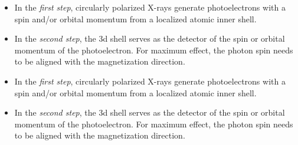 \documentclass[11pt, parskip=full, DIV=14]{scrreprt}
\begin{document}
\begin{tcolorbox}[
colframe=blue!25,
colback=blue!10,
coltitle=blue!20!black,  
fonttitle=\bfseries,
width=0.48\textwidth,
adjusted title=Opportunities]
\begin{itemize}
\item In the \textit{first step}, circularly polarized X-rays generate photoelectrons with a spin and/or orbital momentum from a localized atomic inner shell.
\item In the \textit{second step}, the 3d shell serves as the detector of the spin or orbital momentum of the photoelectron. For maximum effect, the photon spin needs to be aligned with the magnetization direction.
\end{itemize}
\end{tcolorbox}
\begin{tcolorbox}[
colframe=blue!25,
colback=blue!10,
coltitle=blue!20!black,  
fonttitle=\bfseries,
width=0.48\textwidth,
adjusted title=Opportunities]
\begin{itemize}
\item In the \textit{first step}, circularly polarized X-rays generate photoelectrons with a spin and/or orbital momentum from a localized atomic inner shell.
\item In the \textit{second step}, the 3d shell serves as the detector of the spin or orbital momentum of the photoelectron. For maximum effect, the photon spin needs to be aligned with the magnetization direction.
\end{itemize}
\end{tcolorbox}
\end{document}
